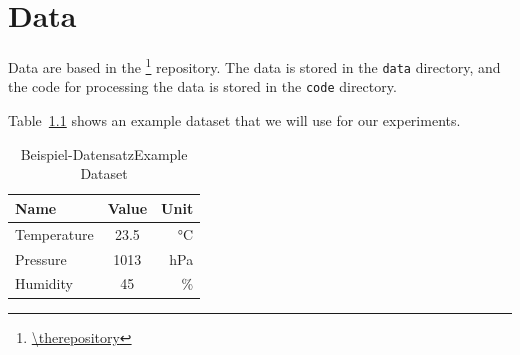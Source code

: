 \chapter{Data}
\label{ch:data}

\Blindtext

Data are based in the \footnote{\url{\therepository}} repository. The data is stored in the \texttt{data} directory, and the code for processing the data is stored in the \texttt{code} directory.

Table~\ref{tab:example} shows an example dataset that we will use for our experiments.

\begin{table}[ht]
	\centering
	\begin{tabular}{l c r}
		\hline
		\textbf{Name} & \textbf{Value} & \textbf{Unit} \\
		\hline
		Temperature   & 23.5           & °C            \\
		Pressure      & 1013           & hPa           \\
		Humidity      & 45             & \%            \\
		\hline
	\end{tabular}
	\caption{\ifde Beispiel-Datensatz\else Example Dataset\fi}
	\label{tab:example}
\end{table}
